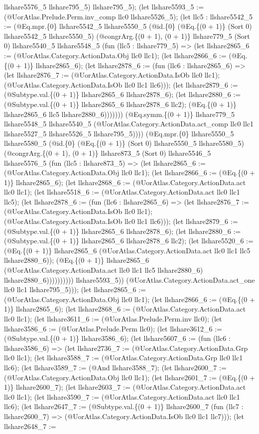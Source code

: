 \documentclass[11pt]{article}
\begin{document}
llshare5576\_5 llshare795\_5) llshare795\_5); (let llshare5593\_5 := (@UorAtlas.Prelude.Perm.inv\_comp llc0 llshare5526\_5); (let llc5 : llshare5542\_5 := (@Eq.mpr.\{0\} llshare5542\_5 llshare5550\_5 (@id.\{0\} (@Eq.\{(0 + 1)\} (Sort 0) llshare5542\_5 llshare5550\_5) (@congrArg.\{(0 + 1), (0 + 1)\} llshare779\_5 (Sort 0) llshare5540\_5 llshare5548\_5 (fun (llc5 : llshare779\_5) => (let llshare2865\_6 := (@UorAtlas.Category.ActionData.Obj llc0 llc1); (let llshare2866\_6 := (@Eq.\{(0 + 1)\} llshare2865\_6); (let llshare2878\_6 := (fun (llc6 : llshare2865\_6) => (let llshare2876\_7 := (@UorAtlas.Category.ActionData.IsOb llc0 llc1); (@UorAtlas.Category.ActionData.IsOb llc0 llc1 llc6))); (let llshare2879\_6 := (@Subtype.val.\{(0 + 1)\} llshare2865\_6 llshare2878\_6); (let llshare2880\_6 := (@Subtype.val.\{(0 + 1)\} llshare2865\_6 llshare2878\_6 llc2); (@Eq.\{(0 + 1)\} llshare2865\_6 llc5 llshare2880\_6))))))) (@Eq.symm.\{(0 + 1)\} llshare779\_5 llshare5548\_5 llshare5540\_5 (@UorAtlas.Category.ActionData.act\_comp llc0 llc1 llshare5527\_5 llshare5526\_5 llshare795\_5)))) (@Eq.mpr.\{0\} llshare5550\_5 llshare5580\_5 (@id.\{0\} (@Eq.\{(0 + 1)\} (Sort 0) llshare5550\_5 llshare5580\_5) (@congrArg.\{(0 + 1), (0 + 1)\} llshare873\_5 (Sort 0) llshare5546\_5 llshare5576\_5 (fun (llc5 : llshare873\_5) => (let llshare2865\_6 := (@UorAtlas.Category.ActionData.Obj llc0 llc1); (let llshare2866\_6 := (@Eq.\{(0 + 1)\} llshare2865\_6); (let llshare2868\_6 := (@UorAtlas.Category.ActionData.act llc0 llc1); (let llshare5518\_6 := (@UorAtlas.Category.ActionData.act llc0 llc1 llc5); (let llshare2878\_6 := (fun (llc6 : llshare2865\_6) => (let llshare2876\_7 := (@UorAtlas.Category.ActionData.IsOb llc0 llc1); (@UorAtlas.Category.ActionData.IsOb llc0 llc1 llc6))); (let llshare2879\_6 := (@Subtype.val.\{(0 + 1)\} llshare2865\_6 llshare2878\_6); (let llshare2880\_6 := (@Subtype.val.\{(0 + 1)\} llshare2865\_6 llshare2878\_6 llc2); (let llshare5520\_6 := (@Eq.\{(0 + 1)\} llshare2865\_6 (@UorAtlas.Category.ActionData.act llc0 llc1 llc5 llshare2880\_6)); (@Eq.\{(0 + 1)\} llshare2865\_6 (@UorAtlas.Category.ActionData.act llc0 llc1 llc5 llshare2880\_6) llshare2880\_6)))))))))) llshare5593\_5)) (@UorAtlas.Category.ActionData.act\_one llc0 llc1 llshare795\_5))); (let llshare2865\_6 := (@UorAtlas.Category.ActionData.Obj llc0 llc1); (let llshare2866\_6 := (@Eq.\{(0 + 1)\} llshare2865\_6); (let llshare2868\_6 := (@UorAtlas.Category.ActionData.act llc0 llc1); (let llshare3611\_6 := (@UorAtlas.Prelude.Perm.inv llc0); (let llshare3586\_6 := (@UorAtlas.Prelude.Perm llc0); (let llshare3612\_6 := (@Subtype.val.\{(0 + 1)\} llshare3586\_6); (let llshare5607\_6 := (fun (llc6 : llshare3586\_6) => (let llshare2736\_7 := (@UorAtlas.Category.ActionData.Grp llc0 llc1); (let llshare3588\_7 := (@UorAtlas.Category.ActionData.Grp llc0 llc1 llc6); (let llshare3589\_7 := (@And llshare3588\_7); (let llshare2600\_7 := (@UorAtlas.Category.ActionData.Obj llc0 llc1); (let llshare2601\_7 := (@Eq.\{(0 + 1)\} llshare2600\_7); (let llshare2603\_7 := (@UorAtlas.Category.ActionData.act llc0 llc1); (let llshare3590\_7 := (@UorAtlas.Category.ActionData.act llc0 llc1 llc6); (let llshare2647\_7 := (@Subtype.val.\{(0 + 1)\} llshare2600\_7 (fun (llc7 : llshare2600\_7) => (@UorAtlas.Category.ActionData.IsOb llc0 llc1 llc7))); (let llshare2648\_7 := 
\end{document}
